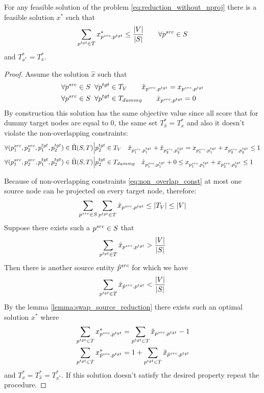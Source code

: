 \begin{corollary} \label{col:bound_num_proj_reduction}
  For any feasible solution of the problem \eqref{eq:reduction_without_nproj} there is a feasible solution  \( x^* \)
  such that
  \[
    \sum\limits_{p^{tgt} \in T} x^*_{p^{src}, p^{tgt}} \leq \frac{|V|}{|S|}
    \qquad \forall p^{src} \in S
  \]
  and \( T_{x^*}^* =  T^*_x \).
\end{corollary}
\begin{proof}
  Assume the solution \( \hat{x} \) such that
  \begin{align*}
    & \forall p^{src} \in S \;\; \forall p^{tgt} \in T_V \qquad \hat{x}_{p^{src}, p^{tgt}} = x_{p^{src}, p^{tgt}} \\
    & \forall p^{src} \in S \;\; \forall p^{tgt} \in T_{dummy} \qquad \hat{x}_{p^{src}, p^{tgt}} = 0
  \end{align*}
  By construction this solution has the same objective value since all score that for dummy target nodes are equal to \( 0 \),
  the same set \( T^*_{\hat{x}} = T^*_x \)
  and also it doesn't violate the non-overlapping constraints:
  \begin{align*}
    & \forall (p_1^{src}, p_2^{src}, p_1^{tgt}, p_2^{tgt}) \in \hat{\Pi}(S, T) \Big| p_2^{tgt} \in T_{V} \quad
    \hat{x}_{p_1^{src}, p_1^{tgt}} + \hat{x}_{p_2^{src}, p_2^{tgt}} =
    x_{p_1^{src}, p_1^{tgt}} + x_{p_2^{src}, p_2^{tgt}} \leq 1                                                      \\
    & \forall (p_1^{src}, p_2^{src}, p_1^{tgt}, p_2^{tgt}) \in \hat{\Pi}(S, T) \Big| p_2^{tgt} \in T_{dummy} \quad
    \hat{x}_{p_1^{src}, p_1^{tgt}} + 0 \leq
    x_{p_1^{src}, p_1^{tgt}} + x_{p_2^{src}, p_2^{tgt}} \leq 1
  \end{align*}

  Because of non-overlapping constraints \eqref{eq:non_overlap_const} at most one source node can
  be projected on every target node, therefore:
  \[
    \sum\limits_{p^{src} \in S} \sum\limits_{p^{tgt} \in T} \hat{x}_{p^{src}, p^{tgt}} \leq |T_V| \leq |V|
  \]
  Suppose there exists such a \( p^{src} \in S \) that
  \[
    \sum\limits_{p^{tgt} \in T} \hat{x}_{p^{src}, p^{tgt}} > \frac{|V|}{|S|}
  \]
  Then there is another source entity \( \hat{p}^{src} \) for which we have
  \[
    \sum\limits_{p^{tgt} \in T} \hat{x}_{\hat{p}^{src}, p^{tgt}} < \frac{|V|}{|S|}
  \]
  By the lemma \ref{lemma:swap_source_reduction} there exists such an optimal solution \( x^* \)
  where
  \begin{align*}
    & \sum\limits_{p^{tgt} \in T} x^*_{p^{src}, p^{tgt}} = \sum\limits_{p^{tgt} \in T} \hat{x}_{p^{src}, p^{tgt}} - 1             \\
    & \sum\limits_{p^{tgt} \in T} x^*_{\hat{p}^{src}, p^{tgt}} = 1 + \sum\limits_{p^{tgt} \in T} \hat{x}_{\hat{p}^{src}, p^{tgt}} \\
  \end{align*}
  and \( T^*_x = T^*_{\hat{x}} = T^*_{x^*}  \). If this solution doesn't satisfy the desired property repeat the procedure.
\end{proof}

